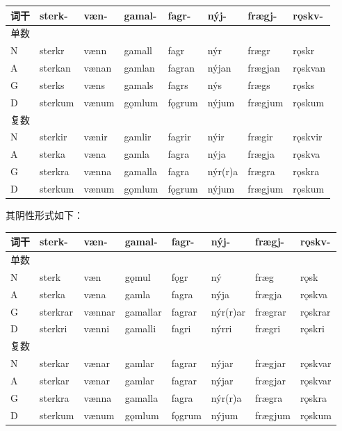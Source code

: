 \begin{longtable}{llllllll}
    \toprule
    词干 & sterk-  & væn-  & gamal-  & fagr-  & nýj-    & frægj-  & rǫskv-  \\
    \midrule
    \endhead
    \bottomrule
    \endfoot
    单数 &         &       &         &        &         &         &         \\
    N    & sterkr  & vænn  & gamall  & fagr   & nýr     & frægr   & rǫskr   \\
    A    & sterkan & vænan & gamlan  & fagran & nýjan   & frægjan & rǫskvan \\
    G    & sterks  & væns  & gamals  & fagrs  & nýs     & frægs   & rǫsks   \\
    D    & sterkum & vænum & gǫmlum  & fǫgrum & nýjum   & frægjum & rǫskum  \\
    复数 &         &       &         &        &         &         &         \\
    N    & sterkir & vænir & gamlir  & fagrir & nýir    & frægir  & rǫskvir \\
    A    & sterka  & væna  & gamla   & fagra  & nýja    & frægja  & rǫskva  \\
    G    & sterkra & vænna & gamalla & fagra  & nýr(r)a & frægra  & rǫskra  \\
    D    & sterkum & vænum & gǫmlum  & fǫgrum & nýjum   & frægjum & rǫskum  \\
\end{longtable}

其阴性形式如下：

\begin{longtable}{llllllll}
    \toprule
    词干 & sterk-   & væn-   & gamal-   & fagr-  & nýj-     & frægj-  & rǫskv-  \\
    \midrule
    \endhead
    \bottomrule
    \endfoot
    单数 &          &        &          &        &          &         &         \\
    N    & sterk    & væn    & gǫmul    & fǫgr   & ný       & fræg    & rǫsk    \\
    A    & sterka   & væna   & gamla    & fagra  & nýja     & frægja  & rǫskva  \\
    G    & sterkrar & vænnar & gamallar & fagrar & nýr(r)ar & frægrar & rǫskrar \\
    D    & sterkri  & vænni  & gamalli  & fagri  & nýrri    & frægri  & rǫskri  \\
    复数 &          &        &          &        &          &         &         \\
    N    & sterkar  & vænar  & gamlar   & fagrar & nýjar    & frægjar & rǫskvar \\
    A    & sterkar  & vænar  & gamlar   & fagrar & nýjar    & frægjar & rǫskvar \\
    G    & sterkra  & vænna  & gamalla  & fagra  & nýr(r)a  & frægra  & rǫskra  \\
    D    & sterkum  & vænum  & gǫmlum   & fǫgrum & nýjum    & frægjum & rǫskum  \\
\end{longtable}


